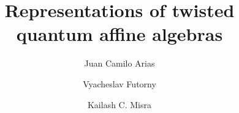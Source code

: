 \documentclass[12pt]{amsart}
\numberwithin{equation}{section}
\begin{document}
\title{Representations of twisted quantum  affine algebras}


\author{Juan Camilo Arias}
\author{Vyacheslav Futorny}
\author{Kailash C. Misra}

\address{School of Sciences and Engineering, Universidad del Rosario, Bogot\'a, Colombia}
\address{Shenzhen International Center for Mathematics, Southern University of Science and Technology, China}
\address{Department of Mathematics, 
 North Carolina State University, 
 Raleigh, NC, USA}


\maketitle
\end{document}

